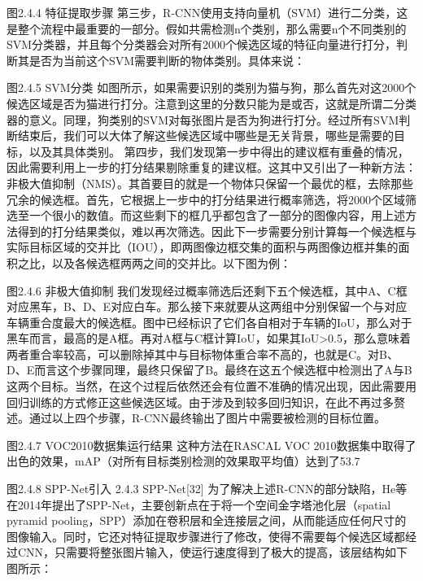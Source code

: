 图2.4.4 特征提取步骤
第三步，R-CNN使用支持向量机（SVM）进行二分类，这是整个流程中最重要的一部分。假如共需检测n个类别，那么需要n个不同类别的SVM分类器，并且每个分类器会对所有2000个候选区域的特征向量进行打分，判断其是否为当前这个SVM需要判断的物体类别。具体来说：

图2.4.5 SVM分类
如图所示，如果需要识别的类别为猫与狗，那么首先对这2000个候选区域是否为猫进行打分。注意到这里的分数只能为是或否，这就是所谓二分类器的意义。同理，狗类别的SVM对每张图片是否为狗进行打分。经过所有SVM判断结束后，我们可以大体了解这些候选区域中哪些是无关背景，哪些是需要的目标，以及其具体类别。
第四步，我们发现第一步中得出的建议框有重叠的情况，因此需要利用上一步的打分结果剔除重复的建议框。这其中又引出了一种新方法：非极大值抑制（NMS）。其首要目的就是一个物体只保留一个最优的框，去除那些冗余的候选框。首先，它根据上一步中的打分结果进行概率筛选，将2000个区域筛选至一个很小的数值。而这些剩下的框几乎都包含了一部分的图像内容，用上述方法得到的打分结果类似，难以再次筛选。因此下一步需要分别计算每一个候选框与实际目标区域的交并比（IOU），即两图像边框交集的面积与两图像边框并集的面积之比，以及各候选框两两之间的交并比。以下图为例：

图2.4.6 非极大值抑制
我们发现经过概率筛选后还剩下五个候选框，其中A、C框对应黑车，B、D、E对应白车。那么接下来就要从这两组中分别保留一个与对应车辆重合度最大的候选框。图中已经标识了它们各自相对于车辆的IoU，那么对于黑车而言，最高的是A框。再对A框与C框计算IoU，如果其IoU>0.5，那么意味着两者重合率较高，可以删除掉其中与目标物体重合率不高的，也就是C。对B、D、E而言这个步骤同理，最终只保留了B。最终在这五个候选框中检测出了A与B这两个目标。当然，在这个过程后依然还会有位置不准确的情况出现，因此需要用回归训练的方式修正这些候选区域。由于涉及到较多回归知识，在此不再过多赘述。通过以上四个步骤，R-CNN最终输出了图片中需要被检测的目标位置。

图2.4.7 VOC2010数据集运行结果
这种方法在RASCAL VOC 2010数据集中取得了出色的效果，mAP（对所有目标类别检测的效果取平均值）达到了53.7%

图2.4.8 SPP-Net引入 
2.4.3 SPP-Net[32]
	为了解决上述R-CNN的部分缺陷，He等在2014年提出了SPP-Net，主要创新点在于将一个空间金字塔池化层（spatial pyramid pooling，SPP）添加在卷积层和全连接层之间，从而能适应任何尺寸的图像输入。同时，它还对特征提取步骤进行了修改，使得不需要每个候选区域都经过CNN，只需要将整张图片输入，使运行速度得到了极大的提高，该层结构如下图所示：

